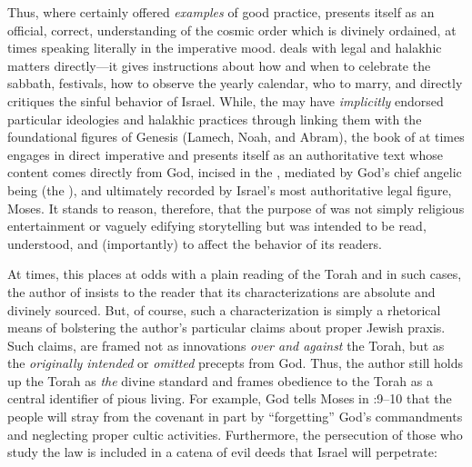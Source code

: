 Thus, where \ga certainly offered \emph{examples} of good practice, \jub presents itself as an official, correct, understanding of the cosmic order which is divinely ordained, at times speaking literally in the imperative mood. \jub deals with legal and halakhic matters directly---it gives instructions about how and when to celebrate the sabbath, festivals, how to observe the yearly calendar, who to marry, and directly critiques the sinful behavior of Israel. While, the \ga may have \emph{implicitly} endorsed particular ideologies and halakhic practices through linking them with the foundational figures of Genesis (Lamech, Noah, and Abram), the book of \jub at times engages in direct imperative and presents itself as an authoritative text whose content comes directly from God, incised in the \heavenlytablets, mediated by God's chief angelic being (the \ap), and ultimately recorded by Israel's most authoritative legal figure, Moses. It stands to reason, therefore, that the purpose of \jub was not simply religious entertainment or vaguely edifying storytelling but was intended to be read, understood, and (importantly) to affect the behavior of its readers. %

At times, this places \jub at odds with a plain reading of the Torah and in such cases, the author of \jub insists to the reader that its characterizations are absolute and divinely sourced. But, of course, such a characterization is simply a rhetorical means of bolstering the author's particular claims about proper Jewish praxis. Such claims, are framed not as innovations \emph{over and against} the Torah, but as the \emph{originally intended} or \emph{omitted} precepts from God. Thus, the author still holds up the Torah as \emph{the} divine standard and frames obedience to the Torah as a central identifier of pious living. For example, God tells Moses in :9--10 that the people will stray from the covenant in part by ``forgetting'' God's commandments and neglecting proper cultic activities. Furthermore, the persecution of those who study the law is included in a catena of evil deeds that Israel will perpetrate:

